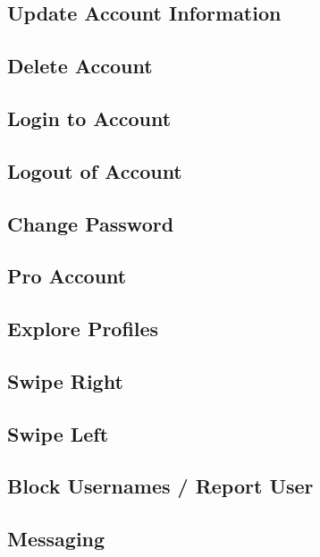\documentclass[10pt, draft]{article}
\begin{document}
\subsection{Update Account Information}
\subsection{Delete Account}
\subsection{Login to Account}
\subsection{Logout of Account}
\subsection{Change Password}
\subsection{Pro Account}
\subsection{Explore Profiles}
\subsection{Swipe Right}
\subsection{Swipe Left}
\subsection{Block Usernames / Report User}
\subsection{Messaging}
\end{document}
